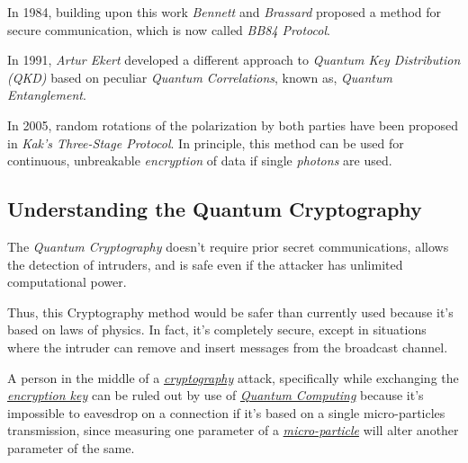 \documentclass[conference]{IEEEtran}
\begin{document}
\vspace{4pt}

In 1984, building upon this work \textit{Bennett} and \textit{Brassard} proposed a method for secure communication, which is now called \textit{BB84 Protocol}.

\vspace{4pt}

In 1991, \textit{Artur Ekert} developed a different approach to \textit{Quantum Key Distribution (QKD)} based on peculiar \textit{Quantum Correlations}, known as, \textit{Quantum Entanglement}.

\vspace{4pt}

In 2005, random rotations of the polarization by both parties have been proposed in \textit{Kak's Three-Stage Protocol}. In principle, this method can be used for continuous, unbreakable \textit{encryption} of data if single \textit{photons} are used.

\subsection{Understanding the Quantum Cryptography}\label{A4}

The \textit{Quantum Cryptography} doesn't require prior secret communications, allows the detection of intruders, and is safe even if the attacker has unlimited computational power.

\vspace{4pt}

Thus, this Cryptography method would be safer than currently used because it's based on laws of physics. In fact, it's completely secure, except in situations where the intruder can remove and insert messages from the broadcast channel.

\vspace{4pt}


A person in the middle of a \href{https://en.wikipedia.org/wiki/Cryptography}{\textit{cryptography}} attack, specifically while exchanging the \href{https://en.wikipedia.org/wiki/Key_(cryptography)}{\textit{encryption key}} can be ruled out by use of \href{https://en.wikipedia.org/wiki/Quantum_computing}{\textit{Quantum Computing}} because it's impossible to eavesdrop on a connection if it's based on a single micro-particles transmission, since measuring one parameter of a \href{https://en.wikipedia.org/wiki/Microparticle}{\textit{micro-particle}} will alter another parameter of the same.
\end{document}

